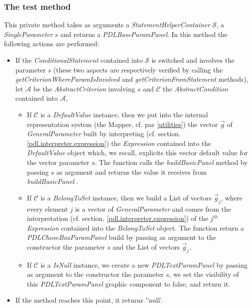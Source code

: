 \documentclass[a4paper,11pt] {ivoa}
\begin{document}
\subsubsection{The test method}
This private method takes as arguments a {\it StatementHelperContainer} $\mathcal S$, a {\it SingleParameter} $s$ and returns a  {\it PDLBaseParamPanel}. In this method the following actions are performed:
\begin{itemize}
\item If the {\it ConditionalStatement} contained into $\mathcal S$ is switched and involves the parameter $s$ (these two aspects are respectively verified by calling the {\it getCriterionWhereParamIsInvolved}  and {\it getCriterionFromStatement} methods), let $\mathcal A$ be the {\it AbstractCriterion} involving $s$ and $\mathcal C$ the {\it AbstractCondition} contained into $\mathcal A$,
\begin{itemize}
\item If $\mathcal C$ is a {\it DefaultValue} instance, then we put into the internal representation system (the Mapper, cf. par \ref{utilities}) the vector $\vec g$ of {\it GeneralParameter} built by interpreting (cf. section. \ref{pdl.interpreter.expression}) the {\it Expression} contained into the {\it DefaultValue} object which, we recall, explicits this vector default value for the vector parameter $s$. The function calls the {\it buildBasicPanel} method by passing $s$ as argument and returns the value it receives from {\it buildBasicPanel} .
\item If $\mathcal C$ is a {\it BelongToSet} instance, then we build a List of vectors $\vec g_j$, where every element $j$ is a vector of {\it GeneralParameter} and comes from the interpretation (cf. section. \ref{pdl.interpreter.expression}) of the  $j^{th}$ {\it Expression} contained into the {\it BelongToSet} object. The function return a {\it PDLChoseBoxParamPanel} build by passing as argument to the constructor the parameter $s$ and the List of vectors $\vec g_j$.
\item If  $\mathcal C$ is a {\it IsNull} instance, we create a new {\it PDLTextParamPanel} by passing as argument to the constructor the parameter $s$, we set the visibility of this  {\it PDLTextParamPanel} graphic component to false, and return it.
\end{itemize}
\item If the method reaches this point, it returns ''null'.
\end{itemize}
\end{document}
